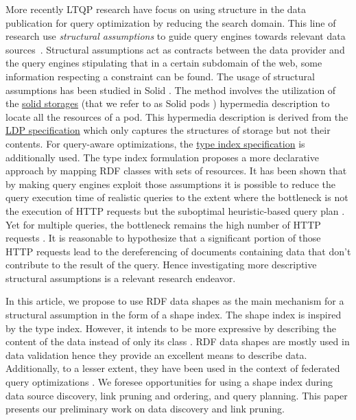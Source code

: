 More recently LTQP research have focus on using structure in the data publication for query optimization by reducing the search domain.
This line of research use \emph{structural assumptions} to guide query engines towards relevant data sources~\cite{Taelman2023,verborgh2020guided}.
Structural assumptions act as contracts between the data provider and the query engines stipulating that in a certain subdomain of the web, some information respecting a constraint can be found.
The usage of structural assumptions has been studied in Solid \cite{Taelman2023}.
The method involves the utilization of the 
\href{https://solidproject.org/TR/protocol#resources}{solid storages} (that we refer to as Solid pods \cite{Taelman2023}) hypermedia description
to locate all the resources of a pod. 
This hypermedia description is derived from the \href{https://www.w3.org/TR/ldp/}{LDP specification}
which only captures the structures of storage but not their contents.
For query-aware optimizations, the \href{https://solid.github.io/type-indexes/}{type index specification} is additionally used.
The type index formulation proposes a more declarative approach \cite{Taelman2017} by mapping RDF classes with sets of resources.
It has been shown that by making query engines exploit those assumptions it is possible to reduce the query execution time
of realistic queries to the extent where the bottleneck is not the execution of 
HTTP requests but the suboptimal heuristic-based query plan \cite{eschauzier_quweda_2023, Taelman2023}.
Yet for multiple queries, the bottleneck remains the high number of HTTP requests  \cite{eschauzier_quweda_2023}.
It is reasonable to hypothesize that a significant portion of those HTTP requests lead to the dereferencing of
documents containing data that don't contribute to the result of the query.
Hence investigating more descriptive structural assumptions is a relevant research endeavor.

In this article, we propose to use RDF data shapes as the main mechanism for a structural assumption in the form of a shape index.
The shape index is inspired by the type index.
However, it intends to be more expressive by describing the content of the data instead of only its class \cite{Taelman2017}.
RDF data shapes are mostly used in data validation \cite{Gayo2018a} hence they provide an excellent means to describe data.
Additionally, to a lesser extent, they have been used in the context of federated query optimizations \cite{kashif2021}.
We foresee opportunities for using a shape index during data source discovery, link pruning and ordering, and query planning.
This paper presents our preliminary work on data discovery and link pruning.

